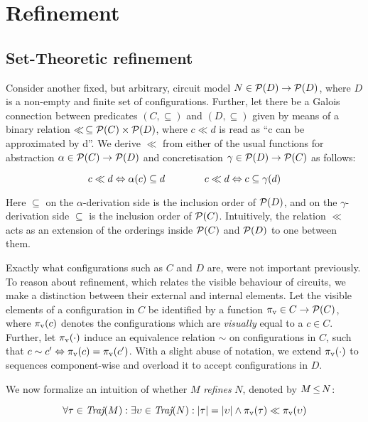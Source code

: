 \section{Refinement}

\subsection{Set-Theoretic refinement}

Consider another fixed, but arbitrary, circuit model $N \in \mathcal{P}(D) \rightarrow \mathcal{P}(D)$, where $D$ is a non-empty and finite set of configurations. Further, let there be a Galois connection between predicates $(C, \subseteq)$ and $(D, \subseteq)$ given by means of a binary relation $\ll \, \subseteq \mathcal{P}(C) \times \mathcal{P}(D)$, where $c \ll d$ is read as ``c can be approximated by d''. We derive $\ll$ from either of the usual functions for abstraction $\alpha \in \mathcal{P}(C) \rightarrow \mathcal{P}(D)$ and concretisation $\gamma \in \mathcal{P}(D) \rightarrow \mathcal{P}(C)$ as follows:

\begin{equation*}
c \ll d \Leftrightarrow \alpha(c) \subseteq d \quad\quad\quad\quad c \ll d \Leftrightarrow c \subseteq \gamma(d)
\end{equation*}

\noindent Here $\subseteq$ on the $\alpha$-derivation side is the inclusion order of $\mathcal{P}(D)$, and on the $\gamma$-derivation side $\subseteq$ is the inclusion order of $\mathcal{P}(C)$. Intuitively, the relation $\ll$ acts as an extension of the orderings inside $\mathcal{P}(C)$ and $\mathcal{P}(D)$ to one between them.

Exactly what configurations such as $C$ and $D$ are, were not important previously. To reason about refinement, which relates the visible behaviour of circuits, we make a distinction between their external and internal elements. Let the visible elements of a configuration in $C$ be identified by a function $\pi_{\textrm{v}} \in C \rightarrow \mathcal{P}(C)$, where $\pi_{\textrm{v}}(c)$ denotes the configurations which are \textit{visually} equal to a $c \in C$. Further, let $\pi_{\textrm{v}}(\cdot)$ induce an equivalence relation $\sim$ on configurations in $C$, such that $c \sim c' \Leftrightarrow \pi_{\textrm{v}}(c) = \pi_{\textrm{v}}(c')$. With a slight abuse of notation, we extend $\pi_{\textrm{v}}(\cdot)$ to sequences component-wise and overload it to accept configurations in $D$.

We now formalize an intuition of whether $M$ \textit{refines} $N$, denoted by $M \operatorname{\leq} N$:

\begin{equation*}
\forall \tau \in \operatorname{\textit{Traj}}(M) : \exists \upsilon \in \operatorname{\textit{Traj}}(N) : | \tau | = | \upsilon | \wedge \pi_{\textrm{v}}(\tau) \ll \pi_{\textrm{v}}(\upsilon)
\end{equation*}

